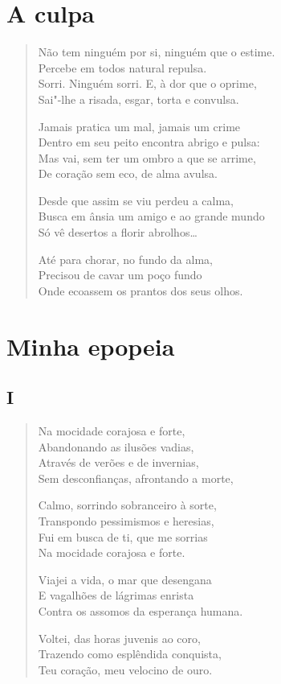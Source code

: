 \pagebreak
\section{A culpa}

\begin{verse}
Não tem ninguém por si, ninguém que o estime.\\
Percebe em todos natural repulsa.\\
Sorri. Ninguém sorri. E, à dor que o oprime,\\
Sai"-lhe a risada, esgar, torta e convulsa.

Jamais pratica um mal, jamais um crime\\
Dentro em seu peito encontra abrigo e pulsa:\\
Mas vai, sem ter um ombro a que se arrime,\\
De coração sem eco, de alma avulsa.

Desde que assim se viu perdeu a calma,\\
Busca em ânsia um amigo e ao grande mundo\\
Só vê desertos a florir abrolhos\ldots{}

Até para chorar, no fundo da alma,\\
Precisou de cavar um poço fundo\\
Onde ecoassem os prantos dos seus olhos.
\end{verse}

\pagebreak
\section{Minha epopeia}

\subsection*{I}

\begin{verse}
Na mocidade corajosa e forte,\\
Abandonando as ilusões vadias,\\
Através de verões e de invernias,\\
Sem desconfianças, afrontando a morte,

Calmo, sorrindo sobranceiro à sorte,\\
Transpondo pessimismos e heresias,\\
Fui em busca de ti, que me sorrias\\
Na mocidade corajosa e forte.

Viajei a vida, o mar que desengana\\
E vagalhões de lágrimas enrista\\
Contra os assomos da esperança humana.

Voltei, das horas juvenis ao coro,\\
Trazendo como esplêndida conquista,\\
Teu coração, meu velocino de ouro.
\end{verse}

